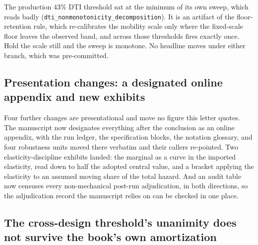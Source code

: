 \documentclass[11pt]{article}
\newcommand{\run}[1]{\texttt{#1}}
\begin{document}
The production 43\% DTI threshold sat at the minimum of its own sweep, which reads
badly (\run{dti\_nonmonotonicity\_decomposition}). It is an artifact of the
floor-retention rule, which re-calibrates the mobility scale only where the fixed-scale
floor leaves the observed band, and across those thresholds fires exactly once. Hold
the scale still and the sweep is monotone. No headline moves under either branch,
which was pre-committed.

\subsection{Presentation changes: a designated online appendix and new exhibits}

Four further changes are presentational and move no figure this letter quotes. The
manuscript now designates everything after the conclusion as an online appendix, with
the run ledger, the specification blocks, the notation glossary, and four robustness
units moved there verbatim and their callers re-pointed. Two elasticity-discipline
exhibits landed: the marginal as a curve in the imported elasticity, read down to
half the adopted central value, and a bracket applying the elasticity to an assumed
moving share of the total hazard. And an audit table now censuses every
non-mechanical post-run adjudication, in both directions, so the adjudication record
the manuscript relies on can be checked in one place.

\subsection{The cross-design threshold's unanimity does not survive the book's own
amortization}
\end{document}
